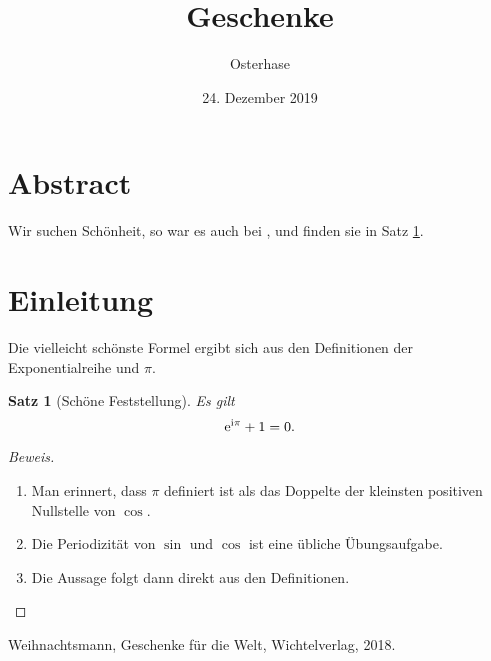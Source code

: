 \documentclass[a4paper]{article}
\title{Geschenke}
\author{Osterhase}
\date{24. Dezember 2019}
\theoremstyle{definition}               %
\theoremstyle{plain}                    %
\newtheorem{satz}{Satz}
\newenvironment{beweis}[1][Beweis]{\begin{proof}[#1]}{\end{proof}}
\newcommand{\mathopf}[1]{{\operatorfont #1}} %
\newcommand{\ee}{\mathopf e}                 %
\newcommand{\ii}{\mathopf i}                 %
\begin{document}
\maketitle
\section*{Abstract}
Wir suchen Schönheit, so war es auch bei \cite{wei}, und finden sie in
Satz \ref{satz:schoen}.
 
\section{Einleitung}
Die vielleicht schönste Formel ergibt sich aus den Definitionen der
Exponentialreihe und $\pi$.
 
\begin{satz}[Schöne Feststellung]\label{satz:schoen}
  Es gilt
  \begin{equation*}
    \ee^{\ii\pi}+1=0. %
  \end{equation*}
\end{satz}
 
\begin{beweis}
  \begin{enumerate}
  \item Man erinnert, dass $\pi$ definiert ist als das Doppelte der
    kleinsten positiven Nullstelle von $\cos$.
  \item Die Periodizität von $\sin$ und $\cos$ ist eine übliche
    Übungsaufgabe.
  \item Die Aussage folgt dann direkt aus den Definitionen. \qedhere
  \end{enumerate}
\end{beweis}
 
\begin{thebibliography}{Wei}
  Weihnachtsmann,
  Geschenke für die Welt,
  Wichtelverlag, 2018.
\end{thebibliography}
\end{document}
